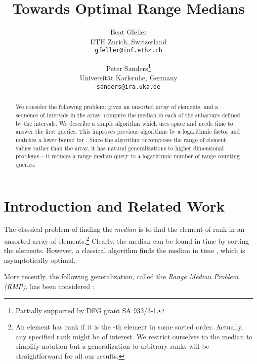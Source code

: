 \documentclass[a4paper,10pt]{article}
\begin{document}
\title{Towards Optimal Range Medians}

\author{Beat Gfeller \\ {\small ETH Zurich, Switzerland} \\ \small{ \texttt{gfeller@inf.ethz.ch}} \and Peter Sanders\thanks{Partially supported by DFG grant SA 933/3-1.}  \\ {\small Universit\"at Karlsruhe, Germany} \\ {\small \texttt{sanders@ira.uka.de}} \smallskip}

\maketitle

\begin{abstract}
  We consider the following problem: given an unsorted array of 
  elements, and a sequence of intervals in the array,
  compute the median in each of
  the subarrays defined by the intervals.  We describe a simple
  algorithm which uses  space and needs  time
  to answer the first   queries.
  This improves previous algorithms by a logarithmic factor and matches a lower bound
  for .
Since the algorithm decomposes the range of element values rather than the array,
  it has natural generalizations to higher dimensional problems -- it reduces a range median query
  to a logarithmic number of range counting queries. 
\end{abstract}


\section{Introduction and Related Work}

The classical problem of finding the \emph{median} is to find the element of rank  in an unsorted array of  elements.\footnote{An element has rank  if it is the -th element in some sorted order. Actually, any specified rank might be of interest. We restrict 
ourselves to the median to simplify notation but a generalization to arbitrary ranks will be straightforward for all our results.}
Clearly, the median can be found in  time by sorting the elements. However, a classical algorithm 
finds the median in  time \cite{DBLP:conf/stoc/BlumFPRT72}, which is asymptotically optimal.



More recently, the following generalization, called the \emph{Range Median Problem (RMP)}, has been considered \cite{DBLP:journals/njc/KrizancMS05,DBLP:conf/esa/Har-PeledM08}:
\end{document}
